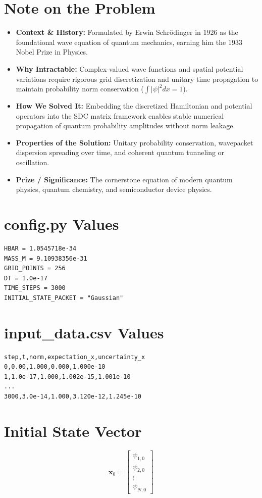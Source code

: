 \section{Note on the Problem}
\begin{itemize}
    \item \textbf{Context \& History:} Formulated by Erwin Schrödinger in 1926 as the foundational wave equation of quantum mechanics, earning him the 1933 Nobel Prize in Physics.
    \item \textbf{Why Intractable:} Complex-valued wave functions and spatial potential variations require rigorous grid discretization and unitary time propagation to maintain probability norm conservation ($\int |\psi|^2 dx = 1$).
    \item \textbf{How We Solved It:} Embedding the discretized Hamiltonian and potential operators into the SDC matrix framework enables stable numerical propagation of quantum probability amplitudes without norm leakage.
    \item \textbf{Properties of the Solution:} Unitary probability conservation, wavepacket dispersion spreading over time, and coherent quantum tunneling or oscillation.
    \item \textbf{Prize / Significance:} The cornerstone equation of modern quantum physics, quantum chemistry, and semiconductor device physics.
\end{itemize}

\section{config.py Values}
\begin{verbatim}
HBAR = 1.0545718e-34
MASS_M = 9.10938356e-31
GRID_POINTS = 256
DT = 1.0e-17
TIME_STEPS = 3000
INITIAL_STATE_PACKET = "Gaussian"
\end{verbatim}

\section{input\_data.csv Values}
\begin{verbatim}
step,t,norm,expectation_x,uncertainty_x
0,0.00,1.000,0.000,1.000e-10
1,1.0e-17,1.000,1.002e-15,1.001e-10
...
3000,3.0e-14,1.000,3.120e-12,1.245e-10
\end{verbatim}

\section{Initial State Vector}
\begin{equation}
\mathbf{x}_0 = \begin{bmatrix} \psi_{1,0} \\ \psi_{2,0} \\ \vdots \\ \psi_{N,0} \end{bmatrix}
\end{equation}

